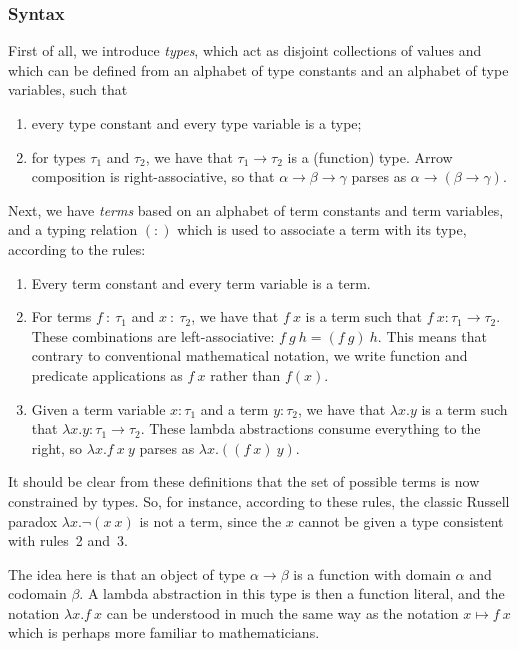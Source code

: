 \subsubsection{Syntax}
First of all, we introduce \emph{types}, which act as disjoint collections of values and which can be defined from an alphabet of type constants and an alphabet of type variables, such that
\begin{enumerate}
\item every type constant and every type variable is a type;
\item for types $\tau_1$ and $\tau_2$, we have that $\tau_1 \rightarrow \tau_2$ is a (function) type. Arrow composition is right-associative, so that $\alpha \rightarrow \beta \rightarrow \gamma$ parses as $\alpha \rightarrow (\beta \rightarrow \gamma)$.
\end{enumerate}

Next, we have \emph{terms} based on an alphabet of term constants and term variables, and a typing relation $(:)$ which is used to associate a term with its type, according to the rules:
\begin{enumerate}
\item Every term constant and every term variable is a term.
\item For terms $f\ :\ \tau_1$ and $x\ :\ \tau_2$, we have that $f\ x$ is a term such that $f\ x : \tau_1\rightarrow \tau_2$. These combinations are left-associative: $f\ g\ h = (f\ g)\ h$. This means that contrary to conventional mathematical notation, we write function and predicate applications as $f\ x$ rather than $f(x)$.
\item Given a term variable $x : \tau_1$ and a term $y : \tau_2$, we have that $\lambda x. y$ is a term such that $\lambda x. y : \tau_1 \rightarrow \tau_2$. These lambda abstractions consume everything to the right, so $\lambda x. f\ x\ y$ parses as $\lambda x. ((f\ x)\ y)$.
\end{enumerate}

It should be clear from these definitions that the set of possible terms is now constrained by types. So, for instance, according to these rules, the classic Russell paradox $\lambda x. \neg(x\ x)$ is not a term, since the $x$ cannot be given a type consistent with rules~2 and~3.

The idea here is that an object of type $\alpha \rightarrow \beta$ is a function with domain $\alpha$ and codomain $\beta$. A lambda abstraction in this type is then a function literal, and the notation $\lambda x. f\ x$ can be understood in much the same way as the notation $x \mapsto f\ x$ which is perhaps more familiar to mathematicians.

